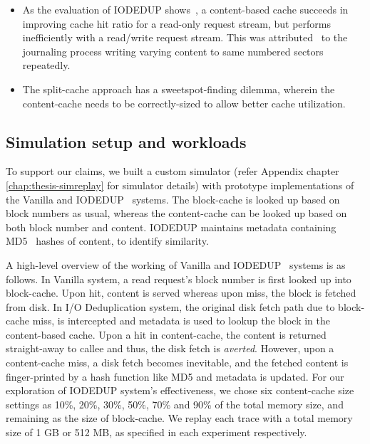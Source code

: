 \begin{itemize}
    \item As the evaluation of IODEDUP shows~\cite{iodedup}, a content-based cache
        succeeds in improving cache hit ratio for a read-only request
        stream, but performs inefficiently with a read/write request stream.
        This was attributed~\cite{iodedup} to the journaling process writing varying
        content to same numbered sectors repeatedly.
    \item The split-cache approach has a sweetspot-finding dilemma, wherein
        the content-cache needs to be correctly-sized to allow better cache
        utilization.
\end{itemize}

\subsection{Simulation setup and workloads}
To support our claims, we built a custom simulator 
(refer Appendix chapter \ref{chap:thesis-simreplay} for 
simulator details) with prototype implementations of the Vanilla and 
IODEDUP~\cite{iodedup} systems.
The block-cache is looked up 
based on block numbers as usual, whereas
the content-cache can be looked up based on both block number
and content.
IODEDUP maintains metadata containing MD5~\cite{md5}
hashes of content, to identify similarity.

A high-level overview of the working of Vanilla and IODEDUP~\cite{iodedup}
systems is as follows.
In Vanilla system, a read request's block number is first looked up
into block-cache. Upon hit, content is served whereas upon miss,
the block is fetched from disk. In I/O Deduplication system, the
original disk fetch path due to block-cache miss, is
intercepted and metadata is used to lookup the block in
the content-based cache.
Upon a hit in content-cache, the content is returned straight-away to callee
and thus, the disk fetch is \textit{averted}.
However, upon a content-cache miss, a
disk fetch becomes inevitable, and the fetched content is finger-printed
by a hash function like MD5 and metadata is updated.
For our exploration of IODEDUP system's effectiveness,
we chose six content-cache size settings as 10\%,
20\%, 30\%, 50\%, 70\% and 90\% of the total memory size, and
remaining as the size of block-cache. We replay each trace
with a total memory size of 1 GB or 512 MB, as specified in each
experiment respectively.

